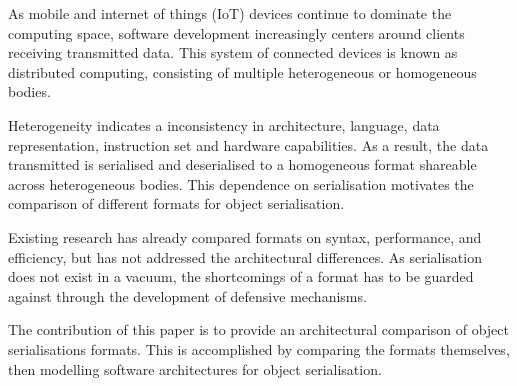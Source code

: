 \documentclass[../report.tex]{subfiles}
\begin{document}
As mobile and internet of things (IoT) devices continue to dominate the computing space, software development increasingly centers around clients receiving transmitted data. This system of connected devices is known as distributed computing, consisting of multiple heterogeneous or homogeneous bodies.

Heterogeneity indicates a inconsistency in architecture, language, data representation, instruction set and hardware capabilities. As a result, the data transmitted is serialised and deserialised to a homogeneous format shareable across heterogeneous bodies. This dependence on serialisation motivates the comparison of different formats for object serialisation. 

Existing research has already compared formats on syntax, performance, and efficiency, but has not addressed the architectural differences. As serialisation does not exist in a vacuum, the shortcomings of a format has to be guarded against through the development of defensive mechanisms.

The contribution of this paper is to provide an architectural comparison of object serialisations formats. This is accomplished by comparing the formats themselves, then modelling software architectures for object serialisation.


\end{document}
